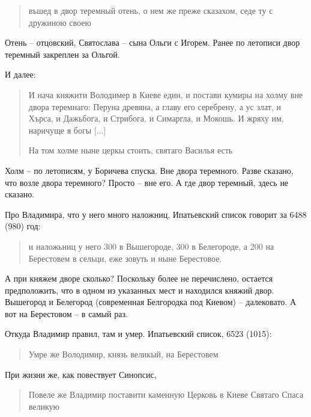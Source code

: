 \begin{quotation}
въшед в двор теремный отень, о нем же преже сказахом, седе ту с дружиною своею
\end{quotation}

Отень – отцовский, Святослава – сына Ольги с Игорем. Ранее по летописи двор теремный закреплен за Ольгой.

И далее:

\begin{quotation}
И нача княжити Володимер в Киеве един, и постави кумиры на холму вне двора теремнаго: Перуна древяна, а главу его серебрену, а ус злат, и Хърса, и Дажьбога, и Стрибога, и Симаргла, и Мокошь. И жряху им, наричуще я богы [...]

На том холме ныне церкы стоить, святаго Василья есть
\end{quotation}

Холм – по летописям, у Боричева спуска. Вне двора теремного. Разве сказано, что возле двора теремного? Просто – вне его. А где двор теремный, здесь не сказано.



Про Владимира, что у него много наложниц, Ипатьевский список говорит за 6488 (980) год:

\begin{quotation}
и наложьниц у него 300 в Вышегороде, 300 в Белегороде, а 200 на Берестовем в сельци, еже зовуть и ныне Берестовое.
\end{quotation}

А при княжем дворе сколько? Поскольку более не перечислено, остается предположить, что в одном из указанных мест и находился княжий двор. Вышегород и Белегород (современная Белгородка под Киевом) – далековато. А вот на Берестовом – в самый раз.

Откуда Владимир правил, там и умер. Ипатьевский список, 6523 (1015):

\begin{quotation}
Умре же Володимир, князь великый, на Берестовем
\end{quotation}

При жизни же, как повествует Синопсис,

\begin{quotation}
Повеле же Владимир поставити каменную Церковь в Киеве Святаго Спаса великую
\end{quotation}

